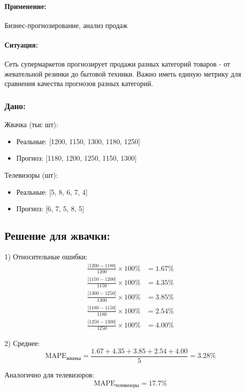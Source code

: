 \documentclass[12pt]{article}
\theoremstyle{definition}
\theoremstyle{definition}
\theoremstyle{definition}
\theoremstyle{remark}
\theoremstyle{remark}
\begin{document}
\paragraph{Применение:} Бизнес-прогнозирование, анализ продаж

\paragraph{Ситуация:} Сеть супермаркетов прогнозирует продажи разных категорий товаров - от жевательной резинки до бытовой техники. Важно иметь единую метрику для сравнения качества прогнозов разных категорий.

\subsubsection*{Дано:}

Жвачка (тыс шт):
\begin{itemize}
    \item Реальные: [1200, 1150, 1300, 1180, 1250]
    \item Прогноз: [1180, 1200, 1250, 1150, 1300]
\end{itemize}

Телевизоры (шт):
\begin{itemize}
    \item Реальные: [5, 8, 6, 7, 4]
    \item Прогноз: [6, 7, 5, 8, 5]
\end{itemize}

\subsection*{Решение для жвачки:}
1) Относительные ошибки:
\begin{align*}
\frac{|1200-1180|}{1200} \times 100\% &= 1.67\% \\
\frac{|1150-1200|}{1150} \times 100\% &= 4.35\% \\
\frac{|1300-1250|}{1300} \times 100\% &= 3.85\% \\
\frac{|1180-1150|}{1180} \times 100\% &= 2.54\% \\
\frac{|1250-1300|}{1250} \times 100\% &= 4.00\%
\end{align*}


2) Среднее:
\[
\text{MAPE}_{\text{жвачка}} = \frac{1.67 + 4.35 + 3.85 + 2.54 + 4.00}{5} = 3.28\%
\]

Аналогично для телевизоров:
\[
\text{MAPE}_{\text{телевизоры}} = 17.7\%
\]
\end{document}
